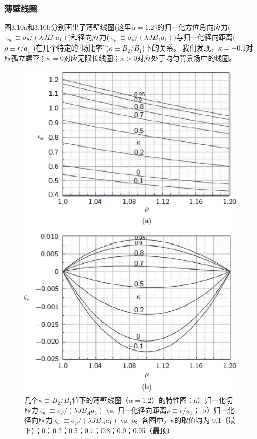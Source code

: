\subsubsection{薄壁线圈}
图3.10a和3.10b分别画出了薄壁线圈(这里$\alpha=1.2$)的归一化方位角向应力($\varsigma_\theta\equiv \sigma_{\theta}/(\lambda J B_1 a_1)$)和径向应力($\varsigma_r\equiv \sigma_{\rho}/(\lambda J B_1 a_1)$)与归一化径向距离($\rho\equiv r/a_1$ )在几个特定的“场比率”($\kappa\equiv B_2/B_1$)下的关系。
我们发现，$\kappa=-0.1$对应孤立螺管；$\kappa=0$对应无限长线圈；$\kappa>0$对应处于均匀背景场中的线圈。
\begin{figure}
  \centering
 \includegraphics[scale=0.8]{chpt3/figs/fig3.10.eps}
  \caption{几个$\kappa\equiv B_2/B_1$值下的薄壁线圈（$\alpha=1.2$）的特性图：a）归一化切应力$\varsigma_\theta\equiv \sigma_\theta/(\lambda J B_A a_1)$ vs. 归一化径向距离$\rho\equiv r/a_1$；
  b）归一化径向应力$\varsigma_r \equiv \sigma_\rho/(\lambda J B_A a_1)$ vs. $\rho$。各图中，$\kappa$的取值均为-0.1（最下）；0；0.2；0.5；0.7；0.8；0.9；0.95（最顶） }
\end{figure}


